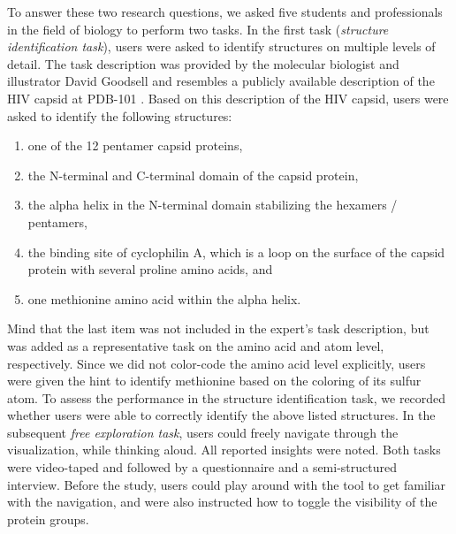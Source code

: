 \documentclass{egpubl}
\begin{document}
	To answer these two research questions, we asked five students and professionals in the field of biology to perform two tasks. 
	In the first task (\emph{structure identification task}), users were asked to identify structures on multiple levels of detail.
	The task description was provided by the molecular biologist and illustrator David Goodsell and resembles a publicly available description of the HIV capsid at PDB-101 \cite{goodsell2016}.
	Based on this description of the HIV capsid, users were asked to identify the following structures: 
	\begin{enumerate}
		\itemsep0em 
		\item one of the 12 pentamer capsid proteins, 
		\item the N-terminal and C-terminal domain of the capsid protein, 
		\item the alpha helix in the N-terminal domain stabilizing the hexamers / pentamers, 
		\item the binding site of cyclophilin A, which is a loop on the surface of the capsid protein with several proline amino acids, and
		\item one methionine amino acid within the alpha helix.
	\end{enumerate}
	Mind that the last item was not included in the expert's task description, but was added as a representative task on the amino acid and atom level, respectively. 
	Since we did not color-code the amino acid level explicitly, users were given the hint to identify methionine based on the coloring of its sulfur atom. 
	To assess the performance in the structure identification task, we recorded whether users were able to correctly identify the above listed structures. 
	In the subsequent \emph{free exploration task}, users could freely navigate through the visualization, while thinking aloud. 
	All reported insights were noted. 
	Both tasks were video-taped and followed by a questionnaire and a semi-structured interview. 
	Before the study, users could play around with the tool to get familiar with the navigation, and were also instructed how to toggle the visibility of the protein groups. 
	
\end{document}
